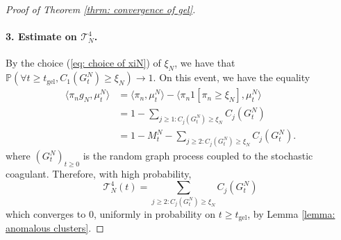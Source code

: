 \begin{proof}[Proof of Theorem \ref{thrm: convergence of gel}]
       \paragraph{3. Estimate on $\mathcal{T}^4_N$.} By the choice (\ref{eq: choice of xiN}) of $\xi_N$, we have that $\mathbb{P}(\forall  t\geq t_\text{gel}, C_1(G^N_t)\geq \xi_N)\rightarrow 1.$ On this event, we have the equality \begin{equation}
           \begin{split}
               \langle \pi_n g_N, \mu^N_t\rangle &=\langle \pi_n, \mu^N_t\rangle - \langle \pi_n 1[\pi_n\geq \xi_N], \mu^N_t\rangle \\[2ex] & = 1-\sum_{j\geq 1: C_j(G^N_t)\ge \xi_N} C_j(G^N_t) \\[2ex] & = 1-M^N_t-\sum_{j\ge 2:C_j(G^N_t)\ge \xi_N} C_j(G^N_t). 
           \end{split} 
       \end{equation} where $(G^N_t)_{t\geq 0}$ is the random graph process coupled to the stochastic coagulant. Therefore, with high probability, \begin{equation} \mathcal{T}^4_N(t) = \sum_{j\ge 2:C_j(G^N_t)\ge \xi_N} C_j(G^N_t) \end{equation} which converges to $0$, uniformly in probability on $t\geq t_\text{gel}$, by Lemma \ref{lemma: anomalous clusters}.

\end{proof}
